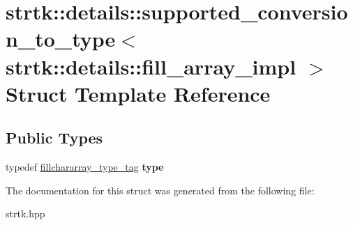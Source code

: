 \hypertarget{structstrtk_1_1details_1_1supported__conversion__to__type_3_01strtk_1_1details_1_1fill__array__impl_01_4}{\section{strtk\-:\-:details\-:\-:supported\-\_\-conversion\-\_\-to\-\_\-type$<$ strtk\-:\-:details\-:\-:fill\-\_\-array\-\_\-impl $>$ Struct Template Reference}
\label{structstrtk_1_1details_1_1supported__conversion__to__type_3_01strtk_1_1details_1_1fill__array__impl_01_4}
}
\subsection*{Public Types}
\begin{DoxyCompactItemize}
\item 
\hypertarget{structstrtk_1_1details_1_1supported__conversion__to__type_3_01strtk_1_1details_1_1fill__array__impl_01_4_a9ad41f363dc809747fec8532291a05ac}{typedef \hyperlink{structstrtk_1_1details_1_1fillchararray__type__tag}{fillchararray\-\_\-type\-\_\-tag} {\bfseries type}}\label{structstrtk_1_1details_1_1supported__conversion__to__type_3_01strtk_1_1details_1_1fill__array__impl_01_4_a9ad41f363dc809747fec8532291a05ac}

\end{DoxyCompactItemize}


The documentation for this struct was generated from the following file\-:\begin{DoxyCompactItemize}
\item 
strtk.\-hpp\end{DoxyCompactItemize}
